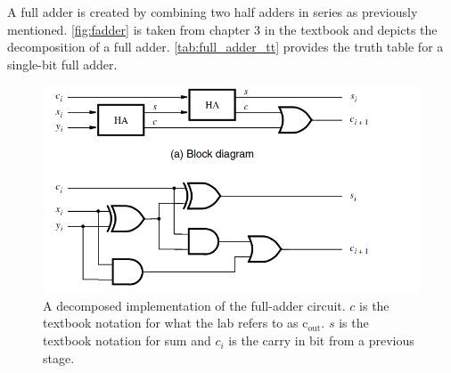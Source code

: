 \documentclass[12pt]{labmanual}
\begin{document}
A full adder is created by combining two half adders in series as previously mentioned. \autoref{fig:fadder} is taken from chapter 3 in the textbook and depicts the decomposition of a full adder. \autoref{tab:full_adder_tt} provides the truth table for a single-bit full adder.
\begin{figure}
    \centering
    \includegraphics[width=1\linewidth]{fulladderdiagram.png}
    \caption{A decomposed implementation of the full-adder circuit. $c$ is the textbook notation for what the lab refers to as $\text{c}_\text{out}$. $s$ is the textbook notation for sum and $c_i$ is the carry in bit from a previous stage.}
    \label{fig:fadder}
\end{figure}
\end{document}
